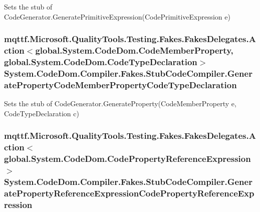 Sets the stub of Code\-Generator.\-Generate\-Primitive\-Expression(\-Code\-Primitive\-Expression e)

\hypertarget{class_system_1_1_code_dom_1_1_compiler_1_1_fakes_1_1_stub_code_compiler_a3fc19bb8965e46f5bbbaba5df57ea634}{
\subsubsection[{Generate\-Property\-Code\-Member\-Property\-Code\-Type\-Declaration}]{\setlength{\rightskip}{0pt plus 5cm}mqttf.\-Microsoft.\-Quality\-Tools.\-Testing.\-Fakes.\-Fakes\-Delegates.\-Action$<$global.\-System.\-Code\-Dom.\-Code\-Member\-Property, global.\-System.\-Code\-Dom.\-Code\-Type\-Declaration$>$ System.\-Code\-Dom.\-Compiler.\-Fakes.\-Stub\-Code\-Compiler.\-Generate\-Property\-Code\-Member\-Property\-Code\-Type\-Declaration}}\label{class_system_1_1_code_dom_1_1_compiler_1_1_fakes_1_1_stub_code_compiler_a3fc19bb8965e46f5bbbaba5df57ea634}


Sets the stub of Code\-Generator.\-Generate\-Property(\-Code\-Member\-Property e, Code\-Type\-Declaration c)

\hypertarget{class_system_1_1_code_dom_1_1_compiler_1_1_fakes_1_1_stub_code_compiler_a17109d0ccc81d8596ad773e835bc8c92}{
\subsubsection[{Generate\-Property\-Reference\-Expression\-Code\-Property\-Reference\-Expression}]{\setlength{\rightskip}{0pt plus 5cm}mqttf.\-Microsoft.\-Quality\-Tools.\-Testing.\-Fakes.\-Fakes\-Delegates.\-Action$<$global.\-System.\-Code\-Dom.\-Code\-Property\-Reference\-Expression$>$ System.\-Code\-Dom.\-Compiler.\-Fakes.\-Stub\-Code\-Compiler.\-Generate\-Property\-Reference\-Expression\-Code\-Property\-Reference\-Expression}}\label{class_system_1_1_code_dom_1_1_compiler_1_1_fakes_1_1_stub_code_compiler_a17109d0ccc81d8596ad773e835bc8c92}


